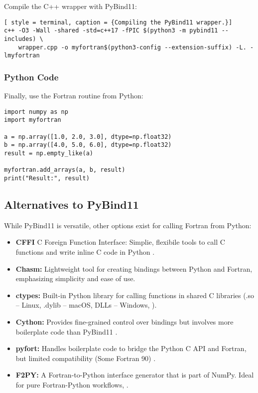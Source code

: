 Compile the C++ wrapper with PyBind11:
\begin{lstlisting}[ style = terminal, caption = {Compiling the PyBind11 wrapper.}]
c++ -O3 -Wall -shared -std=c++17 -fPIC $(python3 -m pybind11 --includes) \
    wrapper.cpp -o myfortran$(python3-config --extension-suffix) -L. -lmyfortran
\end{lstlisting}

\subsubsection{Python Code}
Finally, use the Fortran routine from Python:
\begin{lstlisting}[style=python, caption={Calling the Fortran routine in Python.}]
import numpy as np
import myfortran

a = np.array([1.0, 2.0, 3.0], dtype=np.float32)
b = np.array([4.0, 5.0, 6.0], dtype=np.float32)
result = np.empty_like(a)

myfortran.add_arrays(a, b, result)
print("Result:", result)
\end{lstlisting}

\subsection{Alternatives to PyBind11}
While PyBind11 is versatile, other options exist for calling Fortran from Python:
\begin{itemize}
    \item \textbf{CFFI} C Foreign Function Interface: Simplie, flexibile tools to call C functions and write inline C code in Python \cite{cffi_github,cffi_docs}.
    \item \textbf{Chasm:} Lightweight tool for creating bindings between Python and Fortran, emphasizing simplicity and ease of use.
    \item \textbf{ctypes:} Built-in Python library for calling functions in shared C libraries (.so -- Linux, .dylib -- macOS, DLLs -- Windows, ).
    \item \textbf{Cython:} Provides fine-grained control over bindings but involves more boilerplate code than PyBind11 \cite{cython_docs, cython_quickstart, cython_homepage, cython_tutorial}.
    \item \textbf{pyfort:} Handles boilerplate code to bridge the Python C API and Fortran, but limited compatibility (Some Fortran 90) \cite{pyfort_reference}.
    \item \textbf{F2PY:} A Fortran-to-Python interface generator that is part of NumPy. Ideal for pure Fortran-Python workflows, \cite{f2py_stable,f2py_usage}.
\end{itemize}

